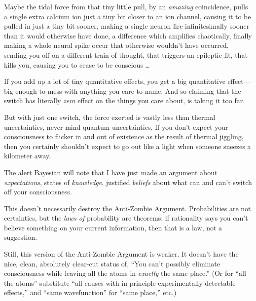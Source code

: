 {
 Maybe the tidal force from that tiny little pull, by an
\textit{amazing} coincidence, pulls a single extra calcium ion just a
tiny bit closer to an ion channel, causing it to be pulled in just a
tiny bit sooner, making a single neuron fire infinitesimally sooner
than it would otherwise have done, a difference which amplifies
chaotically, finally making a whole neural spike occur that otherwise
wouldn't have occurred, sending you off on a different
train of thought, that triggers an epileptic fit, that kills you,
causing you to cease to be conscious \ldots}

{
 If you add up a lot of tiny quantitative effects, you get a big
quantitative effect---big enough to mess with anything you care to
name. And so claiming that the switch has literally \textit{zero}
effect on the things you care about, is taking it too far.}

{
 But with just one switch, the force exerted is vastly less than
thermal uncertainties, never mind quantum uncertainties. If you
don't expect your consciousness to flicker in and out
of existence as the result of thermal jiggling, then you certainly
shouldn't expect to go out like a light when someone
sneezes a kilometer away.}

{
 The alert Bayesian will note that I have just made an argument
about \textit{expectations}, states of \textit{knowledge}, justified
\textit{beliefs} about what can and can't switch off
your consciousness.}

{
 This doesn't necessarily destroy the Anti-Zombie
Argument. Probabilities are not certainties, but the \textit{laws of}
probability are theorems; if rationality says you can't
believe something on your current information, then that is a law, not
a suggestion.}

{
 Still, this version of the Anti-Zombie Argument is weaker. It
doesn't have the nice, clean, absolutely clear-cut
status of, ``You can't possibly
eliminate consciousness while leaving all the atoms in \textit{exactly}
the same place.'' (Or for ``all the
atoms'' substitute ``all causes with
in-principle experimentally detectable effects,'' and
``same wavefunction'' for
``same place,'' etc.)}

